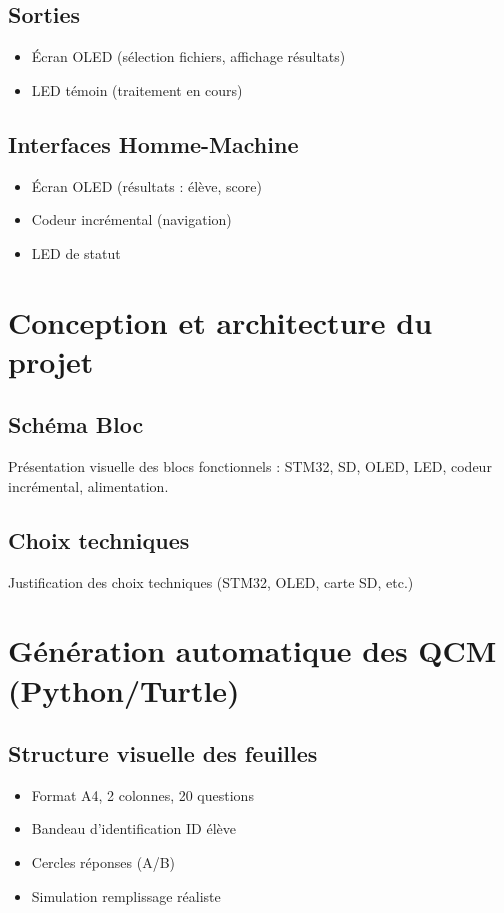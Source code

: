 \documentclass[a4paper,11pt]{article}
\begin{document}
\subsection{Sorties}
\begin{itemize}
    \item Écran OLED (sélection fichiers, affichage résultats)
    \item LED témoin (traitement en cours)
\end{itemize}

\subsection{Interfaces Homme-Machine}
\begin{itemize}
    \item Écran OLED (résultats : élève, score)
    \item Codeur incrémental (navigation)
    \item LED de statut
\end{itemize}

\section{Conception et architecture du projet}

\subsection{Schéma Bloc}
Présentation visuelle des blocs fonctionnels : STM32, SD, OLED, LED, codeur incrémental, alimentation.

\subsection{Choix techniques}
Justification des choix techniques (STM32, OLED, carte SD, etc.)

\section{Génération automatique des QCM (Python/Turtle)}

\subsection{Structure visuelle des feuilles}
\begin{itemize}
    \item Format A4, 2 colonnes, 20 questions
    \item Bandeau d'identification ID élève
    \item Cercles réponses (A/B)
    \item Simulation remplissage réaliste
\end{itemize}
\end{document}

